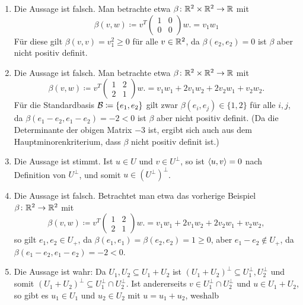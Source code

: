 \documentclass[a4paper, 10pt]{scrartcl}
\begin{document}
\begin{solution}
  \begin{enumerate}[leftmargin=*]
    \item
      Die Aussage ist falsch.
      Man betrachte etwa $\beta \colon \mathbb{R}^2 \times \mathbb{R}^2 \to \mathbb{R}$ mit
      \[
                  \beta(v, w)
        \coloneqq v^T \begin{pmatrix} 1 & 0 \\ 0 & 0 \end{pmatrix} w.
        =         v_1 w_1
      \]
      Für diese gilt $\beta(v,v) = v_1^2 \geq 0$ für alle $v \in \mathbb{R}^2$, da $\beta(e_2, e_2) = 0$ ist $\beta$ aber nicht positiv definit.
    \item
      Die Aussage ist falsch.
      Man betrachte etwa $\beta \colon \mathbb{R}^2 \times \mathbb{R}^2 \to \mathbb{R}$ mit
      \[
                  \beta(v, w)
        \coloneqq v^T \begin{pmatrix} 1 & 2 \\ 2 & 1 \end{pmatrix} w.
        =         v_1 w_1 + 2 v_1 w_2 + 2 v_2 w_1 + v_2 w_2.
      \]
      Für die Standardbasis $\mathcal{B} \coloneqq \{e_1, e_2\}$ gilt zwar $\beta(e_i, e_j) \in \{1, 2\}$ für alle $i,j$, da $\beta(e_1 - e_2, e_1 - e_2) = -2 < 0$ ist $\beta$ aber nicht positiv definit.
      (Da die Determinante der obigen Matrix $-3$ ist, ergibt sich auch aus dem Hauptminorenkriterium, dass $\beta$ nicht positiv definit ist.)
    \item
      Die Aussage ist stimmt.
      Ist $u \in U$ und $v \in U^\perp$, so ist $\left\langle u,v \right\rangle = 0$ nach Definition von $U^\perp$, und somit $u \in (U^\perp)^\perp$.
    \item
      Die Aussage ist falsch.
      Betrachtet man etwa das vorherige Beispiel $\beta \colon \mathbb{R}^2 \to \mathbb{R}^2$ mit
      \[
                  \beta(v, w)
        \coloneqq v^T \begin{pmatrix} 1 & 2 \\ 2 & 1 \end{pmatrix} w.
        =         v_1 w_1 + 2 v_1 w_2 + 2 v_2 w_1 + v_2 w_2,
      \]
      so gilt $e_1, e_2 \in U_+$, da $\beta(e_1, e_1) = \beta(e_2, e_2) = 1 \geq 0$, aber $e_1 - e_2 \notin U_+$, da $\beta(e_1 - e_2, e_1 - e_2) = -2 < 0$.
    \item
      Die Aussage ist wahr:
      Da $U_1, U_2 \subseteq U_1 + U_2$ ist $(U_1 + U_2)^\perp \subseteq U_1^\perp, U_2^\perp$ und somit $(U_1 + U_2)^\perp \subseteq U_1^\perp \cap U_2^\perp$.
      Ist andererseits $v \in U_1^\perp \cap U_2^\perp$ und $u \in U_1 + U_2$, so gibt es $u_1 \in U_1$ und $u_2 \in U_2$ mit $u = u_1 + u_2$, weshalb

\end{enumerate}
\end{solution}
\end{document}
